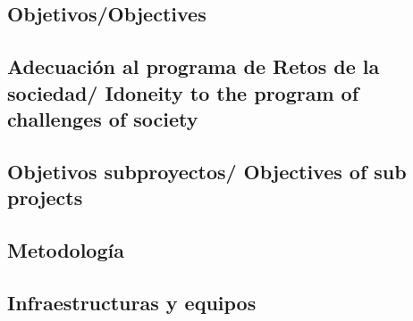 \documentclass[a4paper,11pt,oneside]{article}
\begin{document}


\subsection*{\sc Objetivos/Objectives}



\subsection*{\sc Adecuación al programa de Retos de la sociedad/ Idoneity to the program of challenges of society  }




\subsection*{\sc Objetivos subproyectos/ Objectives of sub projects}





%
%
%
%
%

%
%

\subsection*{\sc Metodología}

%

\subsection*{\sc Infraestructuras y equipos}

%
\end{document}
